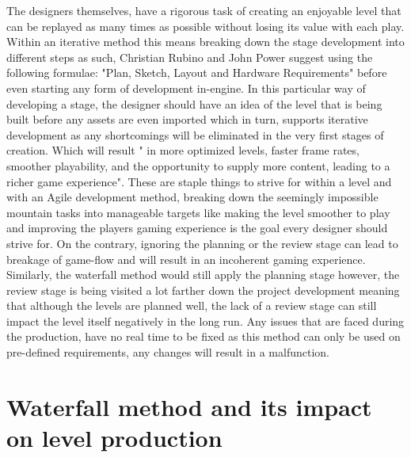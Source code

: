 \documentclass{scrartcl}
\begin{document}
The designers themselves, have a rigorous task of creating an enjoyable level that can be replayed as many times as possible without losing its value with each play. Within an iterative method this means breaking down the stage development into different steps as such, \cite{4} Christian Rubino and John Power suggest using the following formulae: "Plan, Sketch, Layout and Hardware Requirements" before even starting any form of development in-engine. In this particular way of developing a stage, the designer should have an idea of the level that is being built before any assets are even imported which in turn, supports iterative development as any shortcomings will be eliminated in the very first stages of creation. Which will result \cite{4} " in more optimized levels, faster frame rates, smoother playability, and the opportunity to supply more content, leading to a richer game experience". These are staple things to strive for within a level and with an Agile development method, breaking down the seemingly impossible mountain tasks into manageable targets like making the level smoother to play and improving the players gaming experience is the goal every designer should strive for. On the contrary, ignoring the planning or the review stage can lead to breakage of game-flow and will result in an incoherent gaming experience. Similarly, the waterfall method would still apply the planning stage however, the review stage is being visited a lot farther down the project development meaning that although the levels are planned well, the lack of a review stage can still impact the level itself negatively in the long run. Any issues that are faced during the production, have no real time to be fixed as this method can only be used on pre-defined requirements, any changes will result in a malfunction.


\section{Waterfall method and its impact on level production}
\end{document}
